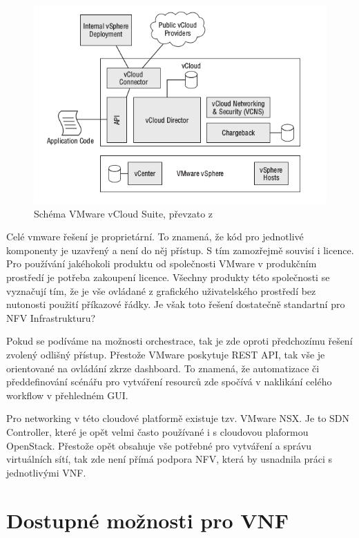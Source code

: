 \begin{figure}[h]
\begin{centering}
\includegraphics[scale=0.65]{images/vmware}
\par\end{centering}
\caption{Schéma VMware vCloud Suite, převzato z \cite{vmware_obrazek}\label{fig:vmware}}
\end{figure}

Celé vmware řešení je proprietární. To znamená, že kód pro jednotlivé komponenty je uzavřený a není do něj přístup. S tím zamozřejmě souvisí i licence. Pro používání jakéhokoli produktu od společnosti VMware v produkčním prostředí je potřeba zakoupení licence. Všechny produkty této společnosti se vyznačují tím, že je vše ovládané z grafického uživatelského prostředí bez nutonosti použití příkazové řádky. Je však toto řešení dostatečně standartní pro NFV Infrastrukturu?

Pokud se podíváme na možnosti orchestrace, tak je zde oproti předchozímu řešení zvolený odlišný přístup. Přestože VMware poskytuje REST API, tak vše je orientované na ovládání zkrze dashboard. To znamená, že automatizace či předdefinování scénářu pro vytváření resourců zde spočívá v naklikání celého workflow v přehledném GUI.

Pro networking v této cloudové platformě existuje tzv. VMware NSX. Je to SDN Controller, které je opět velmi často používané i s cloudovou plaformou OpenStack. Přestože opět obsahuje vše potřebné pro vytváření a správu virtuálních sítí, tak zde není přímá podpora NFV, která by usnadnila práci s jednotlivými VNF.


\section{Dostupné možnosti pro VNF} \label{sec:VNF}

